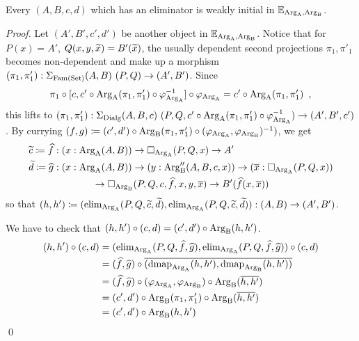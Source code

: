 \documentclass[orivec,envcountsame, ,envcountsect]{llncs}
\begin{document}
\begin{proposition}
\label{thm:elim-to-weak-init}
  Every $(A, B, c, d)$ which has an eliminator is weakly initial in $\mathbb{E}_{\text{Arg}_{\text{A}}, \text{Arg}_{\text{B}}}$.
\end{proposition}
\begin{proof}
  Let $(A', B', c', d')$ be another object in
  $\mathbb{E}_{\text{Arg}_{\text{A}}, \text{Arg}_{\text{B}}}$. Notice that for $P(x) = A'$, $Q(x, y,
  \widetilde{x}) = B'(\widetilde{x})$, the usually dependent second
  projections $\pi_1, \pi'_1$ becomes non-dependent and make up a
  morphism $(\pi_1, \pi'_1) : \Sigma_{\text{Fam}(\text{Set})} (A, B)\ (P, Q) \to (A', B')$. 
  Since
   \[
   \pi_1 \circ [c, c' \circ \text{Arg}_{\text{A}}(\pi_1, \pi'_1) \circ \varphi_{\text{Arg}_{\text{A}}}^{-1}]
         \circ \varphi_{\text{Arg}_{\text{A}}} = c' \circ \text{Arg}_{\text{A}}(\pi_1, \pi'_1) \enspace ,
   \]
   this lifts to $(\pi_1, \pi'_1) : \Sigma_{\text{Dialg}} (A, B, c)\ (P, Q, c'
   \circ \text{Arg}_{\text{A}}(\pi_1, \pi'_1) \circ \varphi_{\text{Arg}_{\text{A}}}^{-1}) \to (A', B',
   c')$. By currying $(f, g) \coloneqq (c', d') \circ \text{Arg}_{\text{B}}(\pi_1,
   \pi'_1) \circ (\varphi_{\text{Arg}_{\text{A}}}, \varphi_{\text{Arg}_{\text{B}}})^{-1})$, we get
   \begin{align*} %
     \stepind{c} \coloneqq \widehat{f} &: (x : \ArgA(A, B)) \to \BOX_{\ArgA}(P, Q, x) \to A' \\ 
     \stepind{d} \coloneqq \widehat{g} &: (x : \ArgA(A, B)) \to (y : \ArgB''(A, B, c, x))
     \to
     (\overline{x} : \BOX_{\ArgA}(P, Q, x))  \\
     & \qquad\qquad \to \BOX_{\ArgB}(P, Q, c, \widehat{f}, x, y,
     \overline{x}) \to B'(\widehat{f}(x, \overline{x}))
   \end{align*}
   so that $(h, h') \coloneqq (\text{elim}_{\text{Arg}_{\text{A}}}(P, Q, \widetilde{c}, \widetilde{d}),
   \text{elim}_{\text{Arg}_{\text{A}}}(P, Q, \widetilde{c}, \widetilde{d})) : (A, B) \to (A', B')$.

   We have to check that $(h, h') \circ (c, d) = (c', d') \circ \text{Arg}_{\text{B}}(h, h')$.
   \begin{align*}
     (h, h') \circ (c, d)
     &= (\text{elim}_{\text{Arg}_{\text{A}}}(P, Q, \widehat{f}, \widehat{g}),
          \text{elim}_{\text{Arg}_{\text{A}}}(P, Q, \widehat{f}, \widehat{g})) \circ (c, d) \\
     &= (\widehat{f}, \widehat{g}) \circ \overline{(\text{dmap}_{\text{Arg}_{\text{A}}}(h, h'), \text{dmap}_{\text{Arg}_{\text{B}}}(h, h'))} \\
     &= (\widehat{f}, \widehat{g}) \circ (\varphi_{\text{Arg}_{\text{A}}}, \varphi_{\text{Arg}_{\text{B}}}) \circ \text{Arg}_{\text{B}}(\overline{h, h'}) \\
     &= (c', d') \circ \text{Arg}_{\text{B}}(\pi_1, \pi'_1) \circ \text{Arg}_{\text{B}}(\overline{h, h'}) \\
     &= (c', d') \circ \text{Arg}_{\text{B}}(h, h')
   \end{align*}
\mbox{} \qed %
\end{proof}
\end{document}
